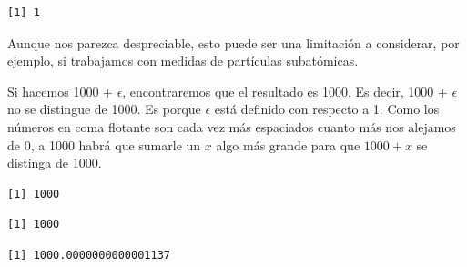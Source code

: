 \documentclass[]{book}
\newenvironment{Shaded}{\begin{snugshade}}{\end{snugshade}}
\newcommand{\DataTypeTok}[1]{\textcolor[rgb]{0.13,0.29,0.53}{#1}}
\newcommand{\DecValTok}[1]{\textcolor[rgb]{0.00,0.00,0.81}{#1}}
\newcommand{\KeywordTok}[1]{\textcolor[rgb]{0.13,0.29,0.53}{\textbf{#1}}}
\newcommand{\NormalTok}[1]{#1}
\newcommand{\OperatorTok}[1]{\textcolor[rgb]{0.81,0.36,0.00}{\textbf{#1}}}
\newcommand{\StringTok}[1]{\textcolor[rgb]{0.31,0.60,0.02}{#1}}
\begin{document}
\begin{verbatim}
[1] 1
\end{verbatim}

Aunque nos parezca despreciable, esto puede ser una limitación a considerar, por ejemplo, si trabajamos con medidas de partículas subatómicas.

Si hacemos 1000 + \(\epsilon\), encontraremos que el resultado es 1000. Es decir, 1000 + \(\epsilon\) no se distingue de 1000. Es porque \(\epsilon\) está definido con respecto a 1. Como los números en coma flotante son cada vez más espaciados cuanto más nos alejamos de 0, a 1000 habrá que sumarle un \(x\) algo más grande para que \(1000 + x\) se distinga de 1000.

\begin{Shaded}
\end{Shaded}

\begin{verbatim}
[1] 1000
\end{verbatim}

\begin{Shaded}
\end{Shaded}

\begin{verbatim}
[1] 1000
\end{verbatim}

\begin{Shaded}
\end{Shaded}

\begin{verbatim}
[1] 1000.0000000000001137
\end{verbatim}
\end{document}
